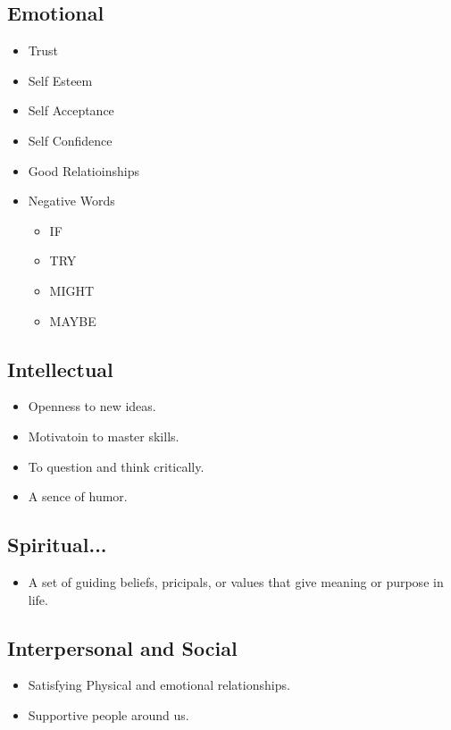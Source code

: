 \documentclass[]{article}
\begin{document}
\subsection{Emotional}
\begin{itemize}
	\item Trust
	\item Self Esteem
	\item Self Acceptance 
	\item Self Confidence 
	\item Good Relatioinships 
	\item Negative Words
	\begin{itemize}
		\item IF
		\item TRY 
		\item MIGHT
		\item MAYBE
	
	\end{itemize}
\end{itemize}

\subsection{Intellectual}
\begin{itemize}
	\item Openness to new ideas.
	\item Motivatoin to master skills.
	\item To question and think critically.
	\item A sence of humor. 
\end{itemize}

\subsection{Spiritual...}
\begin{itemize}
	\item A set of guiding beliefs, pricipals, or values that give meaning or purpose in life.
\end{itemize}

\subsection{Interpersonal and Social}
\begin{itemize}
	\item Satisfying Physical and emotional relationships.
	\item Supportive people around us. 
\end{itemize}
\end{document}
